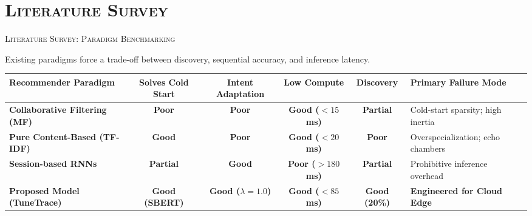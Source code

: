 \documentclass[xcolor=dvipsnames, aspectratio=1610]{beamer}
\begin{document}
\section{\textsc{Literature Survey}}
\begin{frame}{\textsc{Literature Survey: Paradigm Benchmarking}}

  Existing paradigms force a trade-off between discovery, sequential accuracy, and inference latency.

  \vspace{3.5mm}
  \centering
  \fontsize{6pt}{8pt}\selectfont
  \renewcommand{\arraystretch}{1.4}
  \begin{tabular}{p{4.2cm}ccccp{4.5cm}}
      \toprule
      \rowcolor{gray!80}
      \textbf{Recommender Paradigm} & \textbf{Solves Cold Start} & \textbf{Intent Adaptation} & \textbf{Low Compute} & \textbf{Discovery} & \textbf{Primary Failure Mode} \\
      \midrule
      \textbf{Collaborative Filtering (MF)} & \color{red}\textbf{Poor} & \color{red}\textbf{Poor} & \textbf{Good ($<15$ms)} & \textbf{Partial} & Cold-start sparsity; high inertia \\
      \rowcolor{gray!15}
      \textbf{Pure Content-Based (TF-IDF)} & \textbf{Good} & \color{red}\textbf{Poor} & \textbf{Good ($<20$ms)} & \color{red}\textbf{Poor} & Overspecialization; echo chambers \\
      \textbf{Session-based RNNs} & \textbf{Partial} & \textbf{Good} & \color{red}\textbf{Poor ($>180$ms)} & \textbf{Partial} & Prohibitive inference overhead \\
      \midrule
      \rowcolor{blue!10}
      \textbf{Proposed Model (TuneTrace)} & \textbf{\color{blue}Good (SBERT)} & \textbf{\color{blue}Good ($\lambda=1.0$)} & \textbf{\color{blue}Good ($<85$ms)} & \textbf{\color{blue}Good (20\%)} & \textbf{\color{blue}Engineered for Cloud Edge} \\
      \bottomrule
  \end{tabular}

\end{frame}
\end{document}
